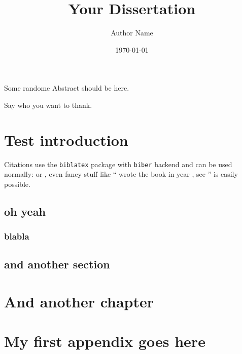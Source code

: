 \documentclass{simple-dissertation}
\title{Your Dissertation}
\date{\today}
\author{Author Name}
\begin{document}
\maketitle

\pagestyle{thesis-preface}

\cleartorecto
{}

Some randome Abstract should be here.

\cleartorecto
{}
Say who you want to thank.



\cleartorecto
\tableofcontents

\cleartorecto
\pagestyle{thesis}

\chapter{Test introduction}

Citations use the \verb|biblatex| package with \verb|biber| backend and can be used normally: \cite{heitzig2016topology} or \citet{heitzig2016topology}, even fancy stuff like ``\citeauthor{kuznetsov1998elements} wrote the book  in year \citeyear{kuznetsov1998elements}, see \cite{kuznetsov1998elements}'' is easily possible.

\lipsum

\section{oh yeah}

\subsection{blabla}

\section{and another section}

\lipsum

\chapter{And another chapter}


\lipsum

\appendix
\chapter{My first appendix goes here}
\end{document}
